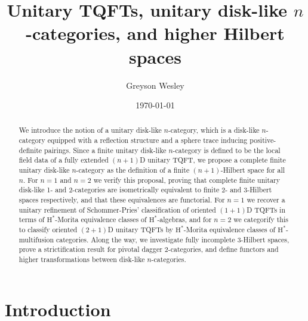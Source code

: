 \documentclass[12pt,reqno]{amsart}
\title{Unitary TQFTs, unitary disk-like {\large \lowercase{$n$}}-categories, and higher Hilbert spaces}
\author{Greyson Wesley}
\date{\today}
\newcommand{\Hstar}{\ensuremath{\mathrm{H}^{*}}}
\begin{document}
\begin{abstract}
We introduce the notion of a unitary disk-like $n$-category, which is a disk-like $n$-category equipped with a reflection structure and a sphere trace inducing positive-definite pairings. Since a finite unitary disk-like $n$-category is defined to be the local field data of a fully extended $(n+1)$D unitary TQFT, we propose a complete finite unitary disk-like $n$-category as the definition of a finite $(n+1)$-Hilbert space for all $n$. For $n=1$ and $n=2$ we verify this proposal, proving that complete finite unitary disk-like 1- and 2-categories are isometrically equivalent to finite 2- and 3-Hilbert spaces respectively, and that these equivalences are functorial. For $n=1$ we recover a unitary refinement of Schommer-Pries' classification of oriented $(1+1)$D TQFTs in terms of $\Hstar$-Morita equivalence classes of $\Hstar$-algebras, and for $n=2$ we categorify this to classify oriented $(2+1)$D unitary TQFTs by $\Hstar$-Morita equivalence classes of $\Hstar$-multifusion categories. Along the way, we investigate fully incomplete 3-Hilbert spaces, prove a strictification result for pivotal dagger 2-categories, and define functors and higher transformations between disk-like $n$-categories.
\end{abstract}

\begingroup
\maketitle
\endgroup

\begingroup\small
\tableofcontents
\endgroup

\section{Introduction}
\end{document}
